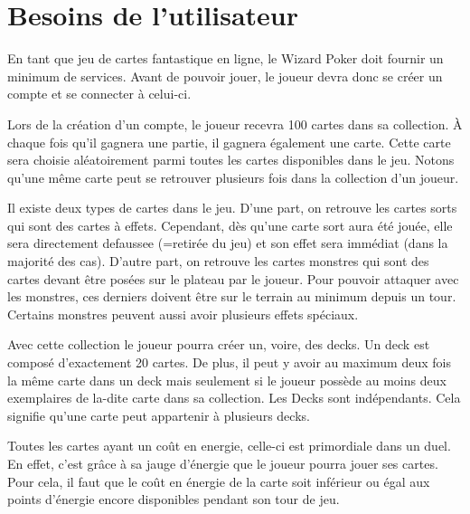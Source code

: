 \documentclass[11pt,a4paper]{article}
\begin{document}
\glsaddall
\printnoidxglossaries


\section{Besoins de l'utilisateur}
\label{sec:besoins}

En tant que jeu de cartes fantastique en ligne, le Wizard Poker doit fournir un minimum de services. Avant de pouvoir jouer, le joueur devra donc se créer un compte et se connecter à celui-ci.

\medbreak

Lors de la création d'un compte, le joueur recevra 100 cartes dans sa \gls{collection}.  À chaque fois qu'il gagnera une partie, il gagnera également une carte.  Cette carte sera choisie aléatoirement parmi toutes les cartes disponibles dans le jeu.  Notons qu'une même carte peut se retrouver plusieurs fois dans la \gls{collection} d'un joueur.

\medbreak
{}
Il existe deux types de \gls{carte}s dans le jeu. D'une part, on retrouve les cartes \gls{sort}s qui sont des cartes à effets. Cependant, dès qu'une carte \gls{sort} aura été jouée, elle sera directement \gls{defausse}e (=retirée du jeu) et son effet sera immédiat (dans la majorité des cas). D'autre part, on retrouve les cartes \gls{monstre}s qui sont des cartes devant être posées sur le plateau par le joueur. Pour pouvoir attaquer avec les monstres, ces derniers doivent être sur le terrain au minimum depuis un tour. Certains monstres peuvent aussi avoir plusieurs effets spéciaux.

\medbreak

Avec cette \gls{collection} le joueur pourra créer un, voire, des \gls{deck}s.  Un \gls{deck} est composé d'exactement 20 cartes.  De plus, il peut y avoir au maximum deux fois la même carte dans un \gls{deck} mais seulement si le joueur possède au moins deux exemplaires de la-dite carte dans sa \gls{collection}.  Les Decks sont indépendants.  Cela signifie qu'une carte peut appartenir à plusieurs decks.

\medbreak

Toutes les cartes ayant un coût en \gls{energie}, celle-ci est primordiale dans un duel. En effet, c'est grâce à sa jauge d'énergie que le joueur pourra jouer ses cartes. Pour cela, il faut que le coût en énergie de la carte soit inférieur ou égal aux points d'énergie encore disponibles pendant son tour de jeu.
\end{document}
